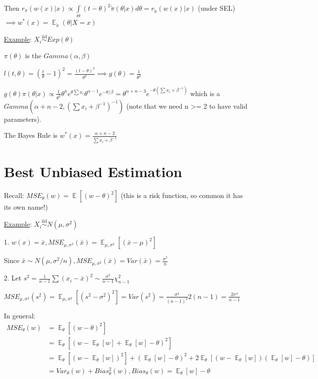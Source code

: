 \documentclass{article}
\DeclareMathOperator{\EX}{\mathbb{E}} %
\let\Oldint=\int
\let\Oldsum=\sum
\renewcommand{\int}{\Oldint\limits}
\renewcommand{\sum}{\Oldsum\limits}
\newcommand{\iiddist}{\overset{\mathrm{iid}}{\sim}}
\begin{document}
Then $r_{\pi}(w(x) | x) \propto \int_{\Theta} (t-\theta)^2\tilde{\pi}(\theta|x)d\theta = r_{\tilde{\pi}}(w(x)|x)$ (under SEL) $\implies w^*(x) = \EX_{\tilde{\pi}}(\theta|X=x)$

\underline{Example}: $X_i \iiddist Exp(\theta)$

$\pi(\theta)$ is the $Gamma(\alpha, \beta)$

$l(t, \theta) = (\frac{t}{\theta} - 1)^2 = \frac{(t-\theta)^2}{\theta^2} \implies g(\theta) = \frac{1}{\theta^2}$

$g(\theta)\pi(\theta|x) \propto \frac{1}{\theta^2}\theta^n e^{\theta \sum x_i}\theta^{\alpha-1}e^{-\theta/\beta} = \theta^{\alpha+n-3}e^{-\theta(\sum x_i + \beta^{-1})}$ which is a $Gamma(\alpha + n -2, (\sum x_i + \beta^{-1})^{-1})$ (note that we need n >= 2 to have valid parameters).

The Bayes Rule is $w^*(x) = \frac{\alpha + n - 2}{\sum x_i + \beta^{-1}}$


\section{Best Unbiased Estimation}

Recall: $MSE_{\theta}(w) = \EX[(w-\theta)^2]$ (this is a risk function, so common it has its own name!)

\underline{Example}: $X_i \iiddist N(\mu, \sigma^2)$

1. $w(x) = \bar{x}, MSE_{\mu, \sigma^2}(\bar{x}) = \EX_{\mu, \sigma^2}[(\bar{x} - \mu)^2]$

Since $\bar{x} \sim N(\mu, \sigma^2/n), MSE_{\mu, \sigma^2}(\bar{x}) = Var(\bar{x}) = \frac{\sigma^2}{n}$

2. Let $s^2 = \frac{1}{n-1}\sum(x_i - \bar{x})^2 \sim \frac{\sigma^2}{n-1}\chi^2_{n-1}$

$MSE_{\mu, \sigma^2}(s^2) = \EX_{\mu, \sigma^2}[(s^2 - \sigma^2)^2] = Var(s^2) = \frac{\sigma^4}{(n-1)^2}2(n-1) = \frac{2\sigma^4}{n-1}$

In general: 
$$
\begin{aligned}
MSE_{\theta}(w) 
&= \EX_{\theta}[(w-\theta)^2] \\
&= \EX_{\theta}[(w - \EX_{\theta}[w] + \EX_{\theta}[w] - \theta)^2] \\
&= \EX_{\theta}[(w - \EX_{\theta}[w])^2] + (\EX_{\theta}[w] - \theta)^2 + 2\EX_{\theta}[(w - \EX_{\theta}[w])(\EX_{\theta}[w] - \theta)] \\
&= Var_{\theta}(w) + Bias^2_{\theta}(w), Bias_{\theta}(w) = \EX_{\theta}[w] - \theta
\end{aligned}
$$
\end{document}
